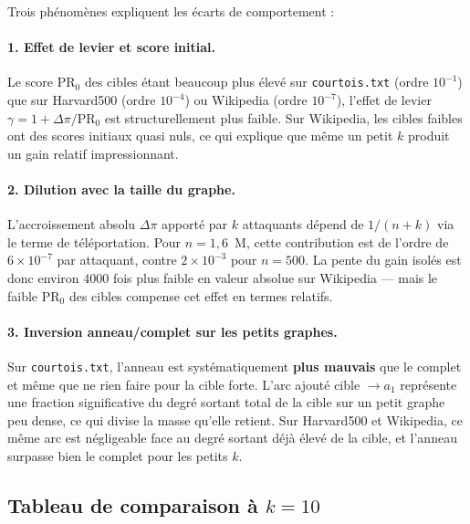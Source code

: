 \documentclass[12pt,a4paper]{article}
\newcommand{\PR}{\mathrm{PR}}
\theoremstyle{definition}
\begin{document}
Trois ph\'{e}nom\`{e}nes expliquent les \'{e}carts de comportement :

\paragraph{1. Effet de levier et score initial.}
Le score $\PR_0$ des cibles \'{e}tant beaucoup plus \'{e}lev\'{e} sur \texttt{courtois.txt}
(ordre $10^{-1}$) que sur Harvard500 (ordre $10^{-4}$) ou Wikipedia (ordre $10^{-7}$),
l'effet de levier $\gamma = 1 + \Delta\pi / \PR_0$ est structurellement plus faible.
Sur Wikipedia, les cibles faibles ont des scores initiaux quasi nuls, ce qui explique
que m\^{e}me un petit $k$ produit un gain relatif impressionnant.

\paragraph{2. Dilution avec la taille du graphe.}
L'accroissement absolu $\Delta\pi$ apport\'{e} par $k$ attaquants d\'{e}pend
de $1/(n+k)$ via le terme de t\'{e}l\'{e}portation. Pour $n = 1{,}6$~M, cette
contribution est de l'ordre de $6 \times 10^{-7}$ par attaquant, contre
$2 \times 10^{-3}$ pour $n=500$. La pente du gain isol\'{e}s est donc environ
$4000$ fois plus faible en valeur absolue sur Wikipedia --- mais le faible $\PR_0$
des cibles compense cet effet en termes relatifs.

\paragraph{3. Inversion anneau/complet sur les petits graphes.}
Sur \texttt{courtois.txt}, l'anneau est syst\'{e}matiquement \textbf{plus mauvais}
que le complet et m\^{e}me que ne rien faire pour la cible forte. L'arc ajout\'{e}
cible $\to a_1$ repr\'{e}sente une fraction significative du degr\'{e} sortant total
de la cible sur un petit graphe peu dense, ce qui divise la masse qu'elle retient.
Sur Harvard500 et Wikipedia, ce m\^{e}me arc est n\'{e}gligeable face au degr\'{e}
sortant d\'{e}j\`{a} \'{e}lev\'{e} de la cible, et l'anneau surpasse bien le complet pour
les petits $k$.

\subsection{Tableau de comparaison \`{a} $k=10$}
\end{document}
